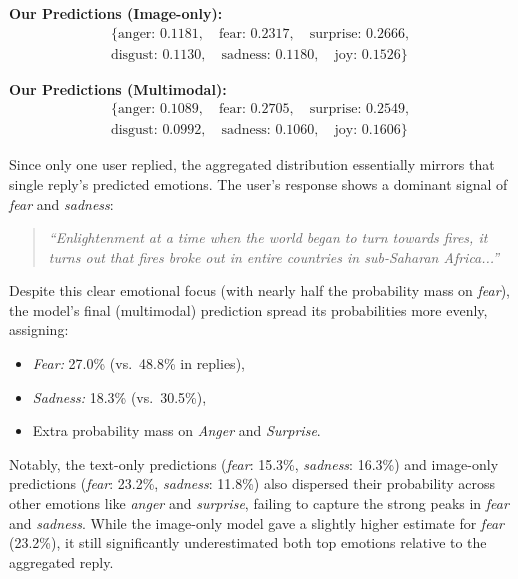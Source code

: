 \noindent\textbf{Our Predictions (Image-only):}
\[
\begin{aligned}
\{\text{anger: } 0.1181, \quad \text{fear: } 0.2317, \quad \text{surprise: } 0.2666, \\
\text{disgust: } 0.1130, \quad \text{sadness: } 0.1180, \quad \text{joy: } 0.1526\}
\end{aligned}
\]

\noindent\textbf{Our Predictions (Multimodal):}
\[
\begin{aligned}
\{\text{anger: } 0.1089, \quad \text{fear: } 0.2705, \quad \text{surprise: } 0.2549, \\
\text{disgust: } 0.0992, \quad \text{sadness: } 0.1060, \quad \text{joy: } 0.1606\}
\end{aligned}
\]

Since only one user replied, the aggregated distribution essentially mirrors that single reply’s predicted emotions. The user’s response shows a dominant signal of \emph{fear} and \emph{sadness}:

\begin{quote}
\emph{``Enlightenment at a time when the world began to turn towards fires, 
it turns out that fires broke out in entire countries in sub-Saharan Africa...''}
\end{quote}

Despite this clear emotional focus (with nearly half the probability mass on \textit{fear}), the model’s final (multimodal) prediction spread its probabilities more evenly, assigning:

\begin{itemize}
    \item \textit{Fear:} 27.0\% (vs.\ 48.8\% in replies),
    \item \textit{Sadness:} 18.3\% (vs.\ 30.5\%),
    \item Extra probability mass on \textit{Anger} and \textit{Surprise}.
\end{itemize}

Notably, the text-only predictions (\textit{fear}: 15.3\%, \textit{sadness}: 16.3\%) and image-only predictions (\textit{fear}: 23.2\%, \textit{sadness}: 11.8\%) also dispersed their probability across other emotions like \textit{anger} and \textit{surprise}, failing to capture the strong peaks in \textit{fear} and \textit{sadness}. While the image-only model gave a slightly higher estimate for \textit{fear} (23.2\%), it still significantly underestimated both top emotions relative to the aggregated reply.
\newline

